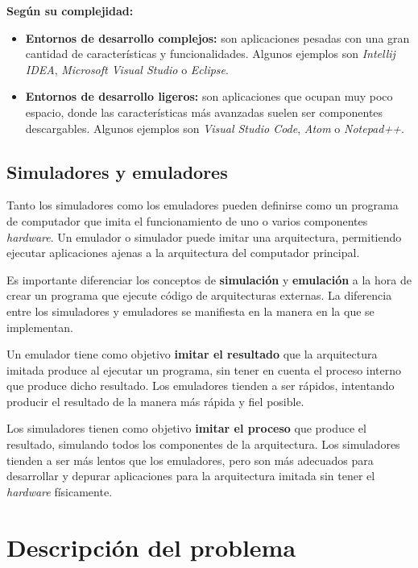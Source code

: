 \noindent \textbf{Según su complejidad:}
\begin{itemize}
    \item \textbf{Entornos de desarrollo complejos:} son aplicaciones pesadas con una gran cantidad de
    características y funcionalidades.
    Algunos ejemplos son \textit{Intellij IDEA},
    \textit{Microsoft Visual Studio} o \textit{Eclipse}.
    \item \textbf{Entornos de desarrollo ligeros:} son aplicaciones que ocupan muy poco espacio, donde
    las características más avanzadas suelen ser componentes descargables.
    Algunos ejemplos son \textit{Visual Studio Code}\cite{VISUALSTUDIOCODE},
    \textit{Atom}\cite{ATOM} o \textit{Notepad++}\cite{NOTEPADPP}.
\end{itemize}

\subsection{Simuladores y emuladores}
\label{subsec:simuladores-y-emuladores}

Tanto los simuladores como los emuladores pueden definirse como un
programa de computador que imita el funcionamiento de uno o varios
componentes \textit{hardware}.
Un emulador o simulador puede imitar una arquitectura, permitiendo
ejecutar aplicaciones ajenas a la arquitectura del computador principal.

\noindent Es importante diferenciar los conceptos de \textbf{simulación}
y \textbf{emulación} a la hora de crear un programa que ejecute
código de arquitecturas externas.
La diferencia entre los simuladores y emuladores se manifiesta
en la manera en la que se implementan.

\noindent Un emulador tiene como objetivo \textbf{imitar el resultado}
que la arquitectura imitada produce al ejecutar un programa, sin tener
en cuenta el proceso interno que produce dicho resultado.
Los emuladores tienden a ser rápidos, intentando producir el resultado
de la manera más rápida y fiel posible.

\noindent Los simuladores tienen como objetivo \textbf{imitar el proceso}
que produce el resultado, simulando todos los componentes de la arquitectura.
Los simuladores tienden a ser más lentos que los emuladores, pero son más
adecuados para desarrollar y depurar aplicaciones para la arquitectura
imitada sin tener el \textit{hardware} físicamente.


\section{Descripción del problema}\label{sec:descripcion-del-problema}

